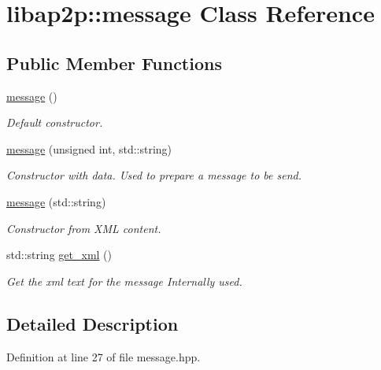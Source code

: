 \hypertarget{classlibap2p_1_1message}{\section{libap2p\-:\-:message Class Reference}
\label{classlibap2p_1_1message}
}
\subsection*{Public Member Functions}
\begin{DoxyCompactItemize}
\item 
\hypertarget{classlibap2p_1_1message_a433fa67765f72a86c6a022aa35ff06b7}{\hyperlink{classlibap2p_1_1message_a433fa67765f72a86c6a022aa35ff06b7}{message} ()}\label{classlibap2p_1_1message_a433fa67765f72a86c6a022aa35ff06b7}

\begin{DoxyCompactList}\small\item\em Default constructor. \end{DoxyCompactList}\item 
\hyperlink{classlibap2p_1_1message_a6609bf74f5cc5e2ea353751abcff149a}{message} (unsigned int, std\-::string)
\begin{DoxyCompactList}\small\item\em Constructor with data. Used to prepare a message to be send. \end{DoxyCompactList}\item 
\hyperlink{classlibap2p_1_1message_ab1c39ec5721f3520eed6735df2f335ef}{message} (std\-::string)
\begin{DoxyCompactList}\small\item\em Constructor from X\-M\-L content. \end{DoxyCompactList}\item 
std\-::string \hyperlink{classlibap2p_1_1message_a9fbf46058138df50dff71e53d04ad383}{get\-\_\-xml} ()
\begin{DoxyCompactList}\small\item\em Get the xml text for the message Internally used. \end{DoxyCompactList}\end{DoxyCompactItemize}


\subsection{Detailed Description}


Definition at line 27 of file message.\-hpp.



